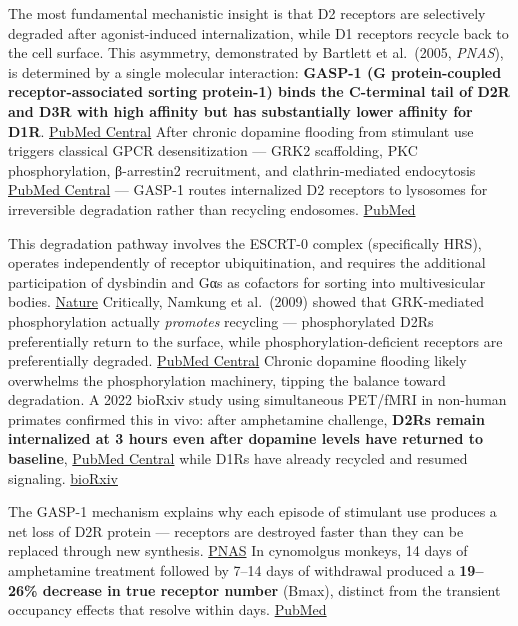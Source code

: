 The most fundamental mechanistic insight is that D2 receptors are selectively degraded after agonist-induced internalization, while D1 receptors recycle back to the cell surface. This asymmetry, demonstrated by Bartlett et al.~(2005, \emph{PNAS}), is determined by a single molecular interaction: \textbf{GASP-1 (G protein-coupled receptor-associated sorting protein-1) binds the C-terminal tail of D2R and D3R with high affinity but has substantially lower affinity for D1R}. \href{https://pmc.ncbi.nlm.nih.gov/articles/PMC1183554/}{PubMed Central} After chronic dopamine flooding from stimulant use triggers classical GPCR desensitization --- GRK2 scaffolding, PKC phosphorylation, β-arrestin2 recruitment, and clathrin-mediated endocytosis \href{https://pmc.ncbi.nlm.nih.gov/articles/PMC9929935/}{PubMed Central} --- GASP-1 routes internalized D2 receptors to lysosomes for irreversible degradation rather than recycling endosomes. \href{https://pubmed.ncbi.nlm.nih.gov/16049099/}{PubMed}

This degradation pathway involves the ESCRT-0 complex (specifically HRS), operates independently of receptor ubiquitination, and requires the additional participation of dysbindin and Gαs as cofactors for sorting into multivesicular bodies. \href{https://www.nature.com/articles/ncomms5556}{Nature} Critically, Namkung et al.~(2009) showed that GRK-mediated phosphorylation actually \emph{promotes} recycling --- phosphorylated D2Rs preferentially return to the surface, while phosphorylation-deficient receptors are preferentially degraded. \href{https://pmc.ncbi.nlm.nih.gov/articles/PMC2685686/}{PubMed Central} Chronic dopamine flooding likely overwhelms the phosphorylation machinery, tipping the balance toward degradation. A 2022 bioRxiv study using simultaneous PET/fMRI in non-human primates confirmed this in vivo: after amphetamine challenge, \textbf{D2Rs remain internalized at 3 hours even after dopamine levels have returned to baseline}, \href{https://pmc.ncbi.nlm.nih.gov/articles/PMC5690884/}{PubMed Central} while D1Rs have already recycled and resumed signaling. \href{https://www.biorxiv.org/content/10.1101/2022.06.10.493955v1.full}{bioRxiv}

The GASP-1 mechanism explains why each episode of stimulant use produces a net loss of D2R protein --- receptors are destroyed faster than they can be replaced through new synthesis. \href{https://www.pnas.org/doi/10.1073/pnas.0502418102}{PNAS} In cynomolgus monkeys, 14 days of amphetamine treatment followed by 7--14 days of withdrawal produced a \textbf{19--26\% decrease in true receptor number} (Bmax), distinct from the transient occupancy effects that resolve within days. \href{https://pubmed.ncbi.nlm.nih.gov/10024013/}{PubMed}

